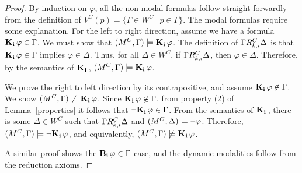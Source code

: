 \begin{proof}
	By induction on $\varphi$, all the non-modal formulas follow straight-forwardly from the definition of $V^C(p) = \{\Gamma \in W^C\ |\ p \in \Gamma\}$. The modal formulas require some explanation. For the left to right direction, assume we have a formula $\mathbf{K}_{\mathbf{i}}\,\varphi \in \Gamma$. We must show that $(M^C, \Gamma) \models \mathbf{K}_{\mathbf{i}}\,\varphi$. The definition of $\Gamma R_{k,i}^C\Delta$ is that $\mathbf{K}_{\mathbf{i}}\,\varphi \in \Gamma$ implies $\varphi \in \Delta$. Thus, for all $\Delta \in W^C$, if $\Gamma R_{k,i}^C \Delta$, then $\varphi \in \Delta$. Therefore, by the semantics of $\mathbf{K}_{\mathbf{i}}\,$, $(M^C, \Gamma) \models \mathbf{K}_{\mathbf{i}}\,\varphi$.
	
	We prove the right to left direction by its contrapositive, and assume $\mathbf{K}_{\mathbf{i}}\,\varphi\not\in\Gamma$. We show $(M^C,\Gamma)\not\models\mathbf{K}_{\mathbf{i}}\,\varphi$. Since $\mathbf{K}_{\mathbf{i}}\,\varphi\not\in\Gamma$, from property (2) of Lemma~\ref{properties} it follows that ${\neg}\mathbf{K}_{\mathbf{i}}\,\varphi\in\Gamma$. From the semantics of $\mathbf{K}_{\mathbf{i}}\,$, there is some $\Delta\in W^C$ such that $\Gamma R_{k,i}^C\Delta$ and $(M^C,\Delta)\models{\neg}\varphi$. Therefore, $(M^C,\Gamma)\models{\neg}\mathbf{K}_{\mathbf{i}}\,\varphi$, and equivalently, $(M^C,\Gamma)\not\models\mathbf{K}_{\mathbf{i}}\,\varphi$. 	
	
	
	A similar proof shows the $\mathbf{B}_{\mathbf{i}}\,\varphi \in \Gamma$ case, and the dynamic modalities follow from the reduction axioms.
\end{proof}

